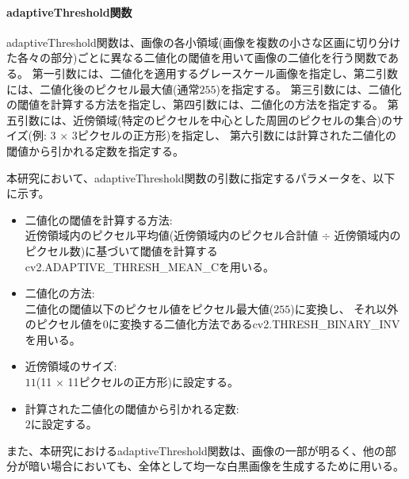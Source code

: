 \paragraph{adaptiveThreshold関数}
adaptiveThreshold関数は、画像の各小領域(画像を複数の小さな区画に切り分けた各々の部分)ごとに異なる二値化の閾値を用いて画像の二値化を行う関数である。
第一引数には、二値化を適用するグレースケール画像を指定し、第二引数には、二値化後のピクセル最大値(通常$255$)を指定する。
第三引数には、二値化の閾値を計算する方法を指定し、第四引数には、二値化の方法を指定する。
第五引数には、近傍領域(特定のピクセルを中心とした周囲のピクセルの集合)のサイズ(例: 3 $\times$ 3ピクセルの正方形)を指定し、
第六引数には計算された二値化の閾値から引かれる定数を指定する。
\par
本研究において、adaptiveThreshold関数の引数に指定するパラメータを、以下に示す。
\begin{itemize}
      \setlength{\itemsep}{0pt}
            \setlength{\parsep}{0pt}
      \item 二値化の閾値を計算する方法:\\
            近傍領域内のピクセル平均値(近傍領域内のピクセル合計値 $\div$ 近傍領域内のピクセル数)に基づいて閾値を計算するcv2.ADAPTIVE\_THRESH\_MEAN\_Cを用いる。
      \item 二値化の方法:\\
            二値化の閾値以下のピクセル値をピクセル最大値($255$)に変換し、
            それ以外のピクセル値を$0$に変換する二値化方法であるcv2.THRESH\_BINARY\_INVを用いる。
      \item 近傍領域のサイズ:\\
            $11$(11 $\times$ 11ピクセルの正方形)に設定する。
      \item 計算された二値化の閾値から引かれる定数:\\
            $2$に設定する。
\end{itemize}
\par
また、本研究におけるadaptiveThreshold関数は、画像の一部が明るく、他の部分が暗い場合においても、全体として均一な白黒画像を生成するために用いる。
\par
